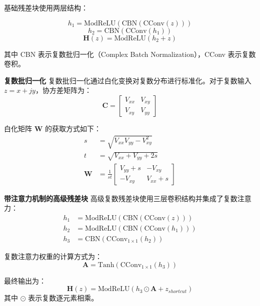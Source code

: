 \documentclass[conference]{IEEEtran}
\begin{document}
基础残差块使用两层结构：

\begin{equation}
h_1 = \text{ModReLU}(\text{CBN}(\text{CConv}(z)))
\end{equation}
\begin{equation}
h_2 = \text{CBN}(\text{CConv}(h_1))
\end{equation}
\begin{equation}
\mathbf{H}(z) = \text{ModReLU}(h_2 + z)
\end{equation}

其中 CBN 表示复数批归一化（Complex Batch Normalization），CConv 表示复数卷积。

\textbf{复数批归一化} 复数批归一化通过白化变换对复数分布进行标准化。对于复数输入 $z = x + jy$，协方差矩阵为：
\begin{equation}
\mathbf{C} = \begin{bmatrix} V_{xx} & V_{xy} \\ V_{xy} & V_{yy} \end{bmatrix}
\end{equation}

白化矩阵 $\mathbf{W}$ 的获取方式如下：
\begin{align}
s &= \sqrt{V_{xx}V_{yy} - V_{xy}^2} \\
t &= \sqrt{V_{xx} + V_{yy} + 2s} \\
\mathbf{W} &= \frac{1}{st}\begin{bmatrix} V_{yy} + s & -V_{xy} \\ -V_{xy} & V_{xx} + s \end{bmatrix}
\end{align}

\textbf{带注意力机制的高级残差块} 高级复数残差块使用三层卷积结构并集成了复数注意力：
\begin{align}
h_1 &= \text{ModReLU}(\text{CBN}(\text{CConv}(z))) \\
h_2 &= \text{ModReLU}(\text{CBN}(\text{CConv}(h_1))) \\
h_3 &= \text{CBN}(\text{CConv}_{1 \times 1}(h_2))
\end{align}

复数注意力权重的计算方式为：
\begin{equation}
\mathbf{A} = \text{Tanh}(\text{CConv}_{1 \times 1}(h_3))
\end{equation}

最终输出为：
\begin{equation}
\mathbf{H}(z) = \text{ModReLU}(h_3 \odot \mathbf{A} + z_{shortcut})
\end{equation}
其中 $\odot$ 表示复数逐元素相乘。
\end{document}
